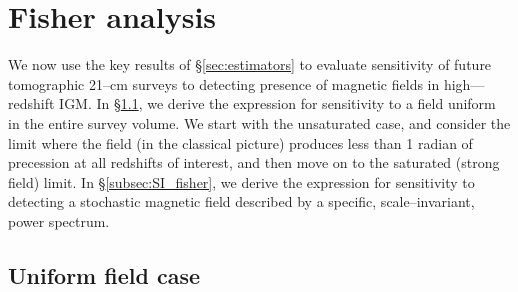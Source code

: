\section{Fisher analysis}
\label{sec:fisher}

We now use the key results of \S\ref{sec:estimators} to evaluate sensitivity of future tomographic 21--cm surveys to detecting presence of magnetic fields in high---redshift IGM. In \S\ref{subsec:uniform_fisher}, we derive the expression for sensitivity to a field uniform in the entire survey volume. We start with the unsaturated case, and consider the limit where the field (in the classical picture) produces less than 1 radian of precession at all redshifts of interest, and then move on to the saturated (strong field) limit. In \S\ref{subsec:SI_fisher}, we derive the expression for sensitivity to detecting a stochastic magnetic field described by a specific, scale--invariant, power spectrum.

\subsection{Uniform field case}
\label{subsec:uniform_fisher}

